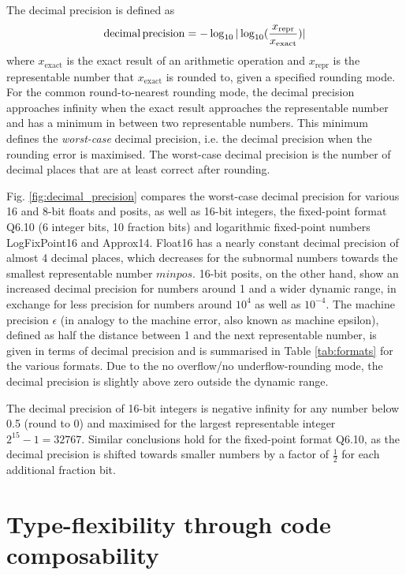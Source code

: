 The decimal precision is defined as \citep{Gustafson2017,Gustafson2017a}
\begin{equation}
\operatorname{decimal} \operatorname{precision} = -\log_{10} \vert \log_{10}( \frac{x_\text{repr}}{x_\text{exact}} ) \vert
\end{equation}
where $x_\text{exact}$ is the exact result of an arithmetic operation and $x_\text{repr}$ is the representable number
that $x_\text{exact}$ is rounded to, given a specified rounding mode. For the common round-to-nearest rounding mode,
the decimal precision approaches infinity when the exact result approaches the representable number and has a minimum
in between two representable numbers. This minimum defines the \emph{worst-case} decimal precision, i.e. the decimal
precision when the rounding error is maximised. The worst-case decimal precision is the number of decimal places that
are at least correct after rounding.

Fig. \ref{fig:decimal_precision} compares the worst-case decimal precision for various 16 and 8-bit floats and posits,
as well as 16-bit integers, the fixed-point format Q6.10 (6 integer bits, 10 fraction bits) and logarithmic fixed-point numbers
LogFixPoint16 and Approx14. Float16 has a nearly constant decimal precision of almost 4 decimal places, which decreases
for the subnormal numbers towards the smallest representable number $minpos$. 16-bit posits, on the other hand, show an
increased decimal precision for numbers around 1 and a wider dynamic range, in exchange for less precision for numbers
around $10^4$ as well as $10^{-4}$.  The machine precision $\epsilon$ (in analogy to the machine error, also known as
machine epsilon), defined as half the distance between 1 and the next representable number, is given in terms of decimal
precision and is summarised in Table \ref{tab:formats} for the various formats. Due to the no overflow/no underflow-rounding
mode, the decimal precision is slightly above zero outside the dynamic range.

The decimal precision of 16-bit integers is negative infinity for any number below 0.5 (round to 0) and maximised for the
largest representable integer $2^{15} - 1 =  32767$. Similar conclusions hold for the fixed-point format Q6.10, as the decimal
precision is shifted towards smaller numbers by a factor of $\tfrac{1}{2}$ for each additional fraction bit.

\section{Type-flexibility through code composability}
